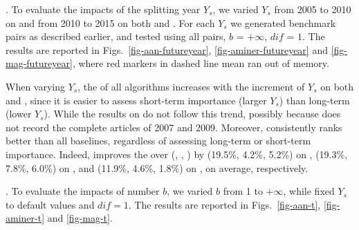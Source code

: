 . %
To evaluate the impacts of the splitting year $Y_s$, we varied $Y_s$ from 2005 to 2010 on \aan and from 2010 to 2015 on both \aminer and \magdata.
For each $Y_s$ we generated benchmark pairs as described earlier, and tested \PairAcc using all pairs, \ie $b$ = $+\infty$, $dif$ = $1$. The results are reported in Figs.~\ref{fig-aan-futureyear}, \ref{fig-aminer-futureyear} and \ref{fig-mag-futureyear}, where red markers \marked{$\Box$} in dashed line mean \hhgrank ran out of memory.


When varying $Y_s$, the \PairAcc of all algorithms increases with the increment of $Y_s$ on both \aminer and \magdata, since it is easier to assess short-term importance (larger $Y_s$) than long-term (lower $Y_s$). While the results on \aan do not follow this trend, possibly because \aan does not record the complete articles of 2007 and 2009.
Moreover, \ensemblerank consistently ranks better than all baselines, regardless of assessing long-term or short-term importance.
Indeed, \ensemblerank improves the \PairAcc over (\pagerank, \futurerank, \hhgrank) by (19.5\%, 4.2\%, 5.2\%) on \aan, (19.3\%, 7.8\%, 6.0\%) on \aminer, and  (11.9\%, 4.6\%, 1.8\%) on \magdata, on average, respectively.




. %
To evaluate the impacts of %
number $b$, we varied $b$ from 1 to $+\infty$, while fixed $Y_s$ to default values and $dif=1$. The results are reported in Figs.~\ref{fig-aan-t}, \ref{fig-aminer-t} and \ref{fig-mag-t}.


